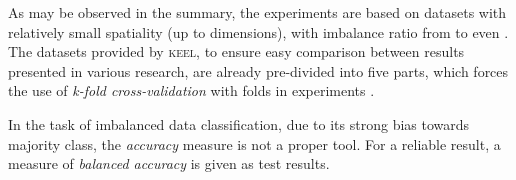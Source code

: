 \documentclass[pmlr]{jmlr}
\begin{document}
\begin{table}[!h]
\centering
{}
\caption{Summary of imbalanced datasets chosen for evaluation}\label{tab:datasets}
\end{table}
  

As may be observed in the summary, the experiments are based on datasets with relatively small spatiality (up to  dimensions), with imbalance ratio from  to even . The datasets provided by \textsc{keel}, to ensure easy comparison between results presented in various research, are already pre-divided into five parts, which forces the use of \emph{k-fold cross-validation} with  folds in experiments \citep{alpaydin2009introduction}.

In the task of imbalanced data classification, due to its strong bias towards majority class, the \emph{accuracy} measure is not a proper tool. For a reliable result, a measure of \emph{balanced accuracy} is given as test results.
\end{document}
